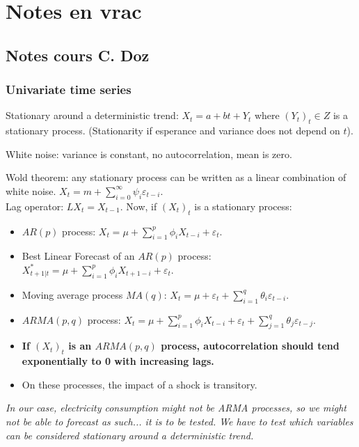 \section{Notes en vrac}

\subsection{Notes cours C. Doz}

\subsubsection{Univariate time series}
Stationary around a deterministic trend: $X_t = a + bt + Y_t$ where $(Y_t)_t \in Z$ is a stationary process. (Stationarity if esperance and variance does not depend on $t$).

White noise: variance is constant, no autocorrelation, mean is zero.

Wold theorem: any stationary process can be written as a linear combination of white noise. $X_t = m + \sum_{i=0}^{\infty} \psi_i \varepsilon_{t-i}$. \\


Lag operator: $LX_t = X_{t-1}$. Now, if $(X_t)_t$ is a stationary process:
\begin{itemize}
    \item $AR(p)$ process: $X_t = \mu + \sum_{i=1}^{p} \phi_i X_{t-i} + \varepsilon_t$.
    \item Best Linear Forecast of an $AR(p)$ process: $X^*_{t+1\vert t} = \mu + \sum_{i=1}^{p} \phi_i X_{t+1-i} + \varepsilon_t$.
    \item Moving average process $MA(q)$: $X_t = \mu + \varepsilon_t + \sum_{i=1}^{q} \theta_i \varepsilon_{t-i}$.
    \item $ARMA(p, q)$ process: $X_t = \mu + \sum_{i=1}^{p} \phi_i X_{t-i} + \varepsilon_t + \sum_{j=1}^{q} \theta_j \varepsilon_{t-j}$.
    \item \textbf{If $(X_t)_t$ is an $ARMA(p, q)$ process, autocorrelation should tend exponentially to 0 with increasing lags.}
    \item On these processes, the impact of a shock is transitory.
\end{itemize}

\textit{In our case, electricity consumption might not be ARMA processes, so we might not be able to forecast as such... it is to be tested. We have to test which variables can be considered stationary around a deterministic trend.}


